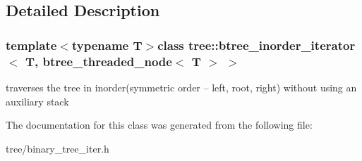 \subsection{Detailed Description}
\subsubsection*{template$<$typename T$>$class tree\-::btree\-\_\-inorder\-\_\-iterator$<$ T, btree\-\_\-threaded\-\_\-node$<$ T $>$ $>$}

traverses the tree in inorder(symmetric order -- left, root, right) without using an auxiliary stack 

The documentation for this class was generated from the following file\-:\begin{DoxyCompactItemize}
\item 
tree/binary\-\_\-tree\-\_\-iter.\-h\end{DoxyCompactItemize}
